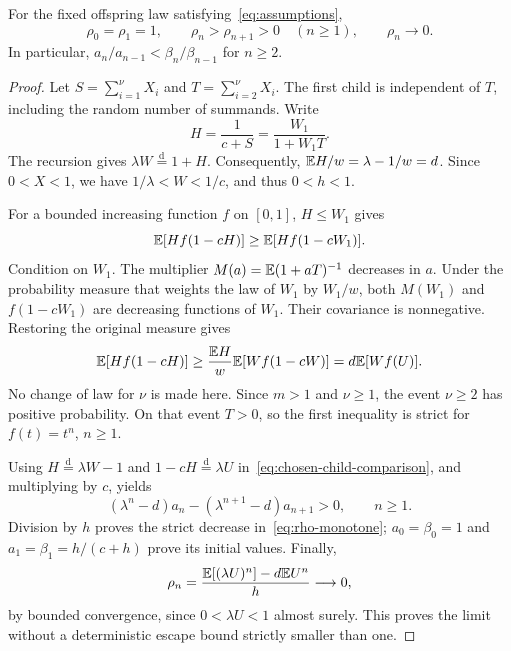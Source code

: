 \begin{lemma}\label{lem:canonical-moments}
For the fixed offspring law satisfying~\eqref{eq:assumptions},
\begin{equation}\label{eq:rho-monotone}
 \rho_0=\rho_1=1,\qquad
 \rho_n>\rho_{n+1}>0\quad(n\ge1),\qquad \rho_n\longrightarrow0.
\end{equation}
In particular, $a_n/a_{n-1}<\beta_n/\beta_{n-1}$ for $n\ge2$.
\end{lemma}
\begin{proof}
Let $S=\sum_{i=1}^{\nu}X_i$ and $T=\sum_{i=2}^{\nu}X_i$. The first child is independent of $T$, including the random number of summands. Write
\[
 H=\frac1{c+S}=\frac{W_1}{1+W_1T}.
\]
The recursion gives $\lambda W\overset{\mathrm d}=1+H$. Consequently,
$\mathbb E H/w=\lambda-1/w=d$. Since $0<X<1$, we have $1/\lambda<W<1/c$, and thus $0<h<1$.

For a bounded increasing function $f$ on $[0,1]$, $H\le W_1$ gives
\[
 \mathbb E[Hf(1-cH)]\ge\mathbb E[Hf(1-cW_1)].
\]
Condition on $W_1$. The multiplier $M(a)=\mathbb E(1+aT)^{-1}$ decreases in $a$. Under the probability measure that weights the law of $W_1$ by $W_1/w$, both $M(W_1)$ and $f(1-cW_1)$ are decreasing functions of $W_1$. Their covariance is nonnegative. Restoring the original measure gives
\begin{equation}\label{eq:chosen-child-comparison}
 \mathbb E[Hf(1-cH)]\ge
 \frac{\mathbb E H}{w}\mathbb E[Wf(1-cW)]
 =d\mathbb E[Wf(U)].
\end{equation}
No change of law for $\nu$ is made here. Since $m>1$ and $\nu\ge1$, the event $\nu\ge2$ has positive probability. On that event $T>0$, so the first inequality is strict for $f(t)=t^n$, $n\ge1$.

Using $H\overset{\mathrm d}=\lambda W-1$ and $1-cH\overset{\mathrm d}=\lambda U$ in~\eqref{eq:chosen-child-comparison}, and multiplying by $c$, yields
\[
 (\lambda^n-d)a_n-(\lambda^{n+1}-d)a_{n+1}>0,
 \qquad n\ge1.
\]
Division by $h$ proves the strict decrease in~\eqref{eq:rho-monotone}; $a_0=\beta_0=1$ and $a_1=\beta_1=h/(c+h)$ prove its initial values. Finally,
\[
 \rho_n=\frac{\mathbb E[(\lambda U)^n]-d\mathbb E U^n}{h}\longrightarrow0,
\]
by bounded convergence, since $0<\lambda U<1$ almost surely. This proves the limit without a deterministic escape bound strictly smaller than one.
\end{proof}

